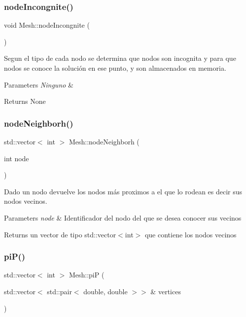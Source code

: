 \subsubsection{\texorpdfstring{node\+Incongnite()}{nodeIncongnite()}}
{\footnotesize\ttfamily void Mesh\+::node\+Incongnite (\begin{DoxyParamCaption}{ }\end{DoxyParamCaption})}



Segun el tipo de cada nodo se determina que nodos son incognita y para que nodos se conoce la solución en ese punto, y son almacenados en memoria. 


\begin{DoxyParams}{Parameters}
{\em Ninguno} & \\
\hline
\end{DoxyParams}
\begin{DoxyReturn}{Returns}
None 
\end{DoxyReturn}
\hypertarget{class_mesh_a9f8707ebeb80eeca1d41ea67a56f7205}{}\label{class_mesh_a9f8707ebeb80eeca1d41ea67a56f7205} 
\subsubsection{\texorpdfstring{node\+Neighborh()}{nodeNeighborh()}}
{\footnotesize\ttfamily std\+::vector$<$ int $>$ Mesh\+::node\+Neighborh (\begin{DoxyParamCaption}\item[{int}]{node }\end{DoxyParamCaption})}



Dado un nodo devuelve los nodos más proximos a el que lo rodean es decir sus nodos vecinos. 


\begin{DoxyParams}{Parameters}
{\em node} & Identificador del nodo del que se desea conocer sus vecinos \\
\hline
\end{DoxyParams}
\begin{DoxyReturn}{Returns}
un vector de tipo std\+::vector$<$int$>$ que contiene los nodos vecinos 
\end{DoxyReturn}
\hypertarget{class_mesh_ab798a46d1133887500152df4dfe40736}{}\label{class_mesh_ab798a46d1133887500152df4dfe40736} 
\subsubsection{\texorpdfstring{pi\+P()}{piP()}}
{\footnotesize\ttfamily std\+::vector$<$ int $>$ Mesh\+::piP (\begin{DoxyParamCaption}\item[{std\+::vector$<$ std\+::pair$<$ double, double $>$$>$ \&}]{vertices }\end{DoxyParamCaption})}



